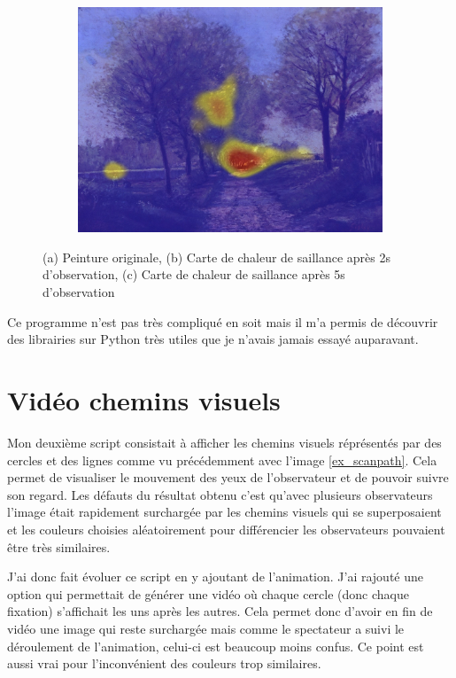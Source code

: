 \begin{figure}[!ht]
\begin{subfigure}{.3\textwidth}
        \includegraphics[width=\linewidth]{datas/fondu_05.jpg}
        \caption{}
    \end{subfigure}
    \caption{(a) Peinture originale, (b) Carte de chaleur de saillance après 2s d'observation, (c) Carte de chaleur de saillance après 5s d'observation}
    \label{fondu}
\end{figure}

\par
Ce programme n'est pas très compliqué en soit mais il m'a permis de découvrir des librairies sur Python très utiles que je n'avais jamais essayé auparavant.

\section{Vidéo chemins visuels}

Mon deuxième script consistait à afficher les chemins visuels réprésentés par des cercles et des lignes comme vu précédemment avec l'image \ref{ex_scanpath}. Cela permet de visualiser le mouvement des yeux de l'observateur et de pouvoir suivre son regard. Les défauts du résultat obtenu c'est qu'avec plusieurs observateurs l'image était rapidement surchargée par les chemins visuels qui se superposaient et les couleurs choisies aléatoirement pour différencier les observateurs pouvaient être très similaires.

\par
J'ai donc fait évoluer ce script en y ajoutant de l'animation. J'ai rajouté une option qui permettait de générer une vidéo où chaque cercle (donc chaque fixation) s'affichait les uns après les autres. Cela permet donc d'avoir en fin de vidéo une image qui reste surchargée mais comme le spectateur a suivi le déroulement de l'animation, celui-ci est beaucoup moins confus. Ce point est aussi vrai pour l'inconvénient des couleurs trop similaires.